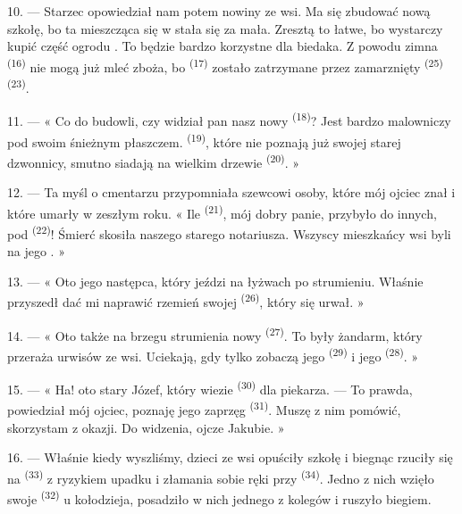 \VUsaut{3.0mm}
\VUsaut{3.0mm}

10. --- Starzec opowiedział nam potem nowiny ze wsi. Ma się zbudować nową szkołę, bo ta
mieszcząca się w  stała się za mała. Zresztą to łatwe, bo wystarczy
kupić część ogrodu . To będzie bardzo korzystne dla biedaka. Z powodu
zimna   \textsuperscript{(16)} nie mogą już mleć
zboża, bo  \textsuperscript{(17)} zostało zatrzymane przez zamarznięty
 \textsuperscript{(25)}  \textsuperscript{(23)}.

11. --- « Co do budowli, czy widział pan nasz nowy 
\textsuperscript{(18)}? Jest bardzo malowniczy pod swoim śnieżnym płaszczem.
 \textsuperscript{(19)}, które nie poznają już swojej starej dzwonnicy,
smutno siadają na wielkim drzewie  \textsuperscript{(20)}. »

12. --- Ta myśl o cmentarzu przypomniała szewcowi osoby, które mój ojciec znał i które
umarły w zeszłym roku. « Ile  \textsuperscript{(21)}, mój dobry panie,
przybyło do innych, pod  \textsuperscript{(22)}! Śmierć skosiła naszego
starego notariusza. Wszyscy mieszkańcy wsi byli na jego . »

13. --- « Oto jego następca, który jeździ na łyżwach po strumieniu. Właśnie przyszedł
dać mi naprawić rzemień swojej  \textsuperscript{(26)}, który się urwał. »

14. --- « Oto także na brzegu strumienia nowy 
\textsuperscript{(27)}. To były żandarm, który przeraża urwisów ze wsi. Uciekają, gdy
tylko zobaczą jego  \textsuperscript{(29)} i jego 
\textsuperscript{(28)}. »

15. --- « Ha! oto stary Józef, który wiezie 
\textsuperscript{(30)} dla piekarza. --- To prawda, powiedział mój ojciec, poznaję jego
zaprzęg  \textsuperscript{(31)}. Muszę z nim pomówić, skorzystam z
okazji. Do widzenia, ojcze Jakubie. »

16. --- Właśnie kiedy wyszliśmy, dzieci ze wsi opuściły szkołę i biegnąc rzuciły się na
 \textsuperscript{(33)} z ryzykiem upadku i złamania sobie ręki przy
 \textsuperscript{(34)}. Jedno z nich wzięło swoje 
\textsuperscript{(32)} u kołodzieja, posadziło w nich jednego z kolegów i ruszyło
biegiem.

